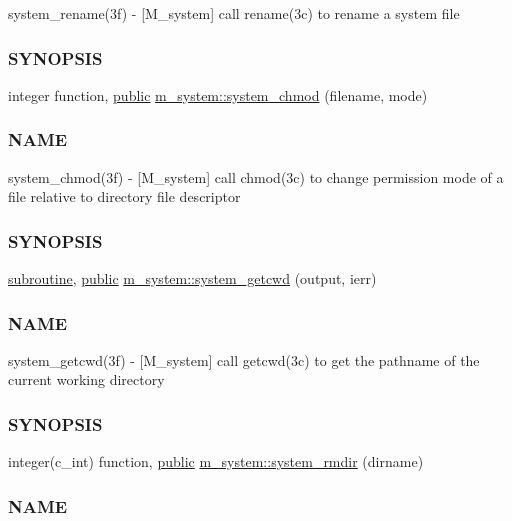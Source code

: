 \begin{DoxyCompactItemize}
\begin{DoxyCompactList}
system\+\_\+rename(3f) -\/ \mbox{[}M\+\_\+system\mbox{]} call rename(3c) to rename a system file \subsubsection*{S\+Y\+N\+O\+P\+S\+IS}\end{DoxyCompactList}\item 
integer function, \hyperlink{M__stopwatch_83_8txt_a2f74811300c361e53b430611a7d1769f}{public} \hyperlink{namespacem__system_ace9ce0c8a9c8341a76b8903cd2390ce3}{m\+\_\+system\+::system\+\_\+chmod} (filename, mode)
\begin{DoxyCompactList}\small\item\em \subsubsection*{N\+A\+ME}

system\+\_\+chmod(3f) -\/ \mbox{[}M\+\_\+system\mbox{]} call chmod(3c) to change permission mode of a file relative to directory file descriptor \subsubsection*{S\+Y\+N\+O\+P\+S\+IS}\end{DoxyCompactList}\item 
\hyperlink{M__stopwatch_83_8txt_acfbcff50169d691ff02d4a123ed70482}{subroutine}, \hyperlink{M__stopwatch_83_8txt_a2f74811300c361e53b430611a7d1769f}{public} \hyperlink{namespacem__system_a5a32db818a9ffb0a4ea724e95356c560}{m\+\_\+system\+::system\+\_\+getcwd} (output, ierr)
\begin{DoxyCompactList}\small\item\em \subsubsection*{N\+A\+ME}

system\+\_\+getcwd(3f) -\/ \mbox{[}M\+\_\+system\mbox{]} call getcwd(3c) to get the pathname of the current working directory \subsubsection*{S\+Y\+N\+O\+P\+S\+IS}\end{DoxyCompactList}\item 
integer(c\+\_\+int) function, \hyperlink{M__stopwatch_83_8txt_a2f74811300c361e53b430611a7d1769f}{public} \hyperlink{namespacem__system_a21fd3e1ccd50cef6adc539ef3d7a9836}{m\+\_\+system\+::system\+\_\+rmdir} (dirname)
\begin{DoxyCompactList}\small\item\em \subsubsection*{N\+A\+ME}


\end{DoxyCompactList}
\end{DoxyCompactItemize}
